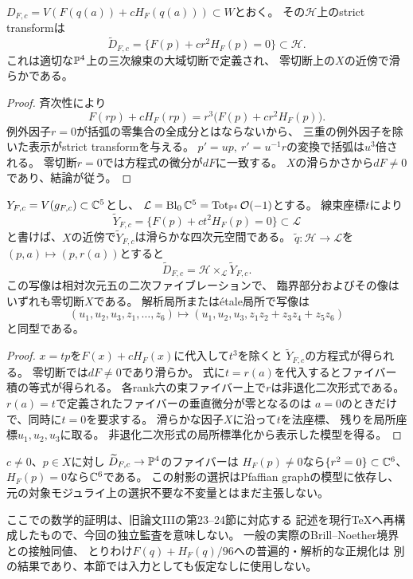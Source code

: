 \begin{proposition}
\label{prop:pfaffian-hessian-strict-transform}
$D_{F,c}=V(F(q(a))+cH_F(q(a)))\subset W$とおく。
その$\mathcal H$上のstrict transformは
\[
 \widetilde D_{F,c}
 =\{F(p)+cr^2H_F(p)=0\}\subset\mathcal H.
\]
これは適切な$\mathbb P^4$上の三次線束の大域切断で定義され、
零切断上の$X$の近傍で滑らかである。
\end{proposition}
\begin{proof}
斉次性により
\[
 F(rp)+cH_F(rp)
 =r^3\bigl(F(p)+cr^2H_F(p)\bigr).
\]
例外因子$r=0$が括弧の零集合の全成分とはならないから、
三重の例外因子を除いた表示がstrict transformを与える。
$p'=up,\ r'=u^{-1}r$の変換で括弧は$u^3$倍される。
零切断$r=0$では方程式の微分が$dF$に一致する。
$X$の滑らかさから$dF\ne0$であり、結論が従う。
\end{proof}

\begin{proposition}[四次元孤立特異点の解消とのファイバー積]
\label{prop:pfaffian-hessian-quadric-fibration}
$Y_{F,c}=V(g_{F,c})\subset\mathbb C^5$とし、
$\mathcal L=\operatorname{Bl}_0\mathbb C^5
=\operatorname{Tot}_{\mathbb P^4}\mathcal O(-1)$とする。
線束座標$t$により
\[
 \widetilde Y_{F,c}=\{F(p)+ct^2H_F(p)=0\}
 \subset\mathcal L
\]
と書けば、$X$の近傍で$\widetilde Y_{F,c}$は滑らかな四次元空間である。
$\widetilde q:\mathcal H\to\mathcal L$を
$(p,a)\mapsto(p,r(a))$とすると
\[
 \widetilde D_{F,c}
 =\mathcal H\times_{\mathcal L}\widetilde Y_{F,c}.
\]
この写像は相対次元五の二次ファイブレーションで、
臨界部分およびその像はいずれも零切断$X$である。
解析局所またはétale局所で写像は
\[
 (u_1,u_2,u_3,z_1,\ldots,z_6)\longmapsto
 (u_1,u_2,u_3,z_1z_2+z_3z_4+z_5z_6)
\]
と同型である。
\end{proposition}
\begin{proof}
$x=tp$を$F(x)+cH_F(x)$に代入して$t^3$を除くと
$\widetilde Y_{F,c}$の方程式が得られる。
零切断では$dF\ne0$であり滑らか。
式に$t=r(a)$を代入するとファイバー積の等式が得られる。
各rank六の束ファイバー上で$r$は非退化二次形式である。
$r(a)=t$で定義されたファイバーの垂直微分が零となるのは
$a=0$のときだけで、同時に$t=0$を要求する。
滑らかな因子$X$に沿って$t$を法座標、
残りを局所座標$u_1,u_2,u_3$に取る。
非退化二次形式の局所標準化から表示した模型を得る。
\end{proof}
\begin{remark}[射影のファイバーのHessian因子]
$c\ne0$、$p\in X$に対し
$\widetilde D_{F,c}\to\mathbb P^4$のファイバーは
$H_F(p)\ne0$なら$\{r^2=0\}\subset\mathbb C^6$、
$H_F(p)=0$なら$\mathbb C^6$である。
この射影の選択はPfaffian graphの模型に依存し、
元の対象モジュライ上の選択不要な不変量とはまだ主張しない。
\end{remark}

\begin{remark}[検証の状態]
ここでの数学的証明は、旧論文IIIの第23--24節に対応する
記述を現行TeXへ再構成したもので、今回の独立監査を意味しない。
一般の実際のBrill--Noether境界との接触同値、
とりわけ$F(q)+H_F(q)/96$への普遍的・解析的な正規化は
別の結果であり、本節では入力としても仮定なしに使用しない。
\end{remark}
